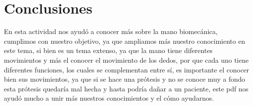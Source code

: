 \documentclass{article}
\begin{document}
\section{Conclusiones}
En esta actividad nos ayudó a conocer más sobre la mano biomecánica, cumplimos con nuestro objetivo, ya que ampliamos más nuestro conocimiento en este tema, si bien es un tema extenso, ya que la mano tiene diferentes movimientos y más el conocer el movimiento de los dedos, por que cada uno tiene diferentes funciones, los cuales se complementan entre sí, es importante el conocer bien sus movimientos, ya que si se hace una prótesis y no se conoce muy a fondo  esta prótesis quedaría mal hecha y hasta podría dañar a un paciente, este pdf nos ayudó mucho a unir más nuestros conocimientos y el cómo ayudarnos.



\end{document}
